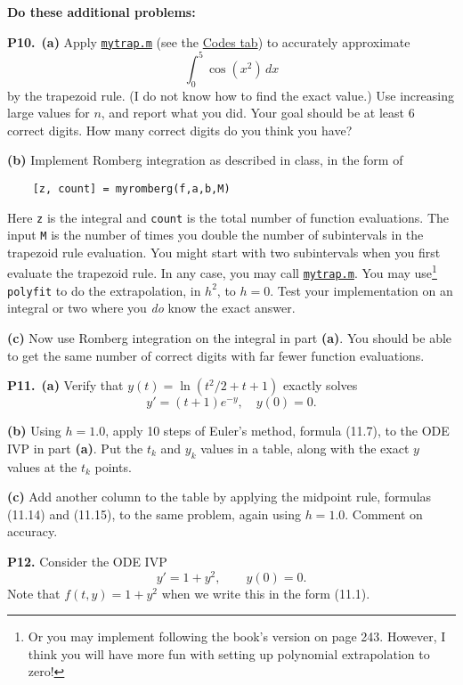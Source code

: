 \documentclass[12pt]{amsart}
\newcommand{\prob}[1]{\bigskip\noindent\textbf{#1.}\quad }
\newcommand{\epart}[1]{\medskip\noindent\textbf{(#1)}\quad }
\newcommand{\ppart}[1]{\,\textbf{(#1)}\quad }
\begin{document}
\medskip

\noindent \textbf{Do these additional problems:}

\prob{P10}  \ppart{a}  Apply \href{https://bueler.github.io/numerical/assets/codes/mytrap.m}{\texttt{mytrap.m}} (see the \href{https://bueler.github.io/numerical/codes.html}{Codes tab}) to accurately approximate
          $$\int_0^5 \cos(x^2)\,dx$$
by the trapezoid rule.  (I do not know how to find the exact value.)  Use increasing large values for $n$, and report what you did.  Your goal should be at least 6 correct digits.  How many correct digits do you think you have?

\epart{b}  Implement Romberg integration as described in class, in the form of 
      
       \verb|    [z, count] = myromberg(f,a,b,M)|

\noindent Here \verb|z| is the integral and \verb|count| is the total number of function evaluations.  The input \verb|M| is the number of times you double the number of subintervals in the trapezoid rule evaluation.  You might start with two subintervals when you first evaluate the trapezoid rule.  In any case, you may call \href{https://bueler.github.io/numerical/assets/codes/mytrap.m}{\texttt{mytrap.m}}.  You may use\footnote{\quad Or you may implement following the book's version on page 243.  However, I think you will have more fun with setting up polynomial extrapolation to zero!} \texttt{polyfit} to do the extrapolation, in $h^2$, to $h=0$.  Test your implementation on an integral or two where you \emph{do} know the exact answer.

\epart{c}  Now use Romberg integration on the integral in part \textbf{(a)}.  You should be able to get the same number of correct digits with far fewer function evaluations.


\prob{P11}  \ppart{a} Verify that $y(t) = \ln(t^2/2 + t + 1)$ exactly solves
	$$y'=(t+1)e^{-y}, \quad y(0)=0.$$

\epart{b}  Using $h=1.0$, apply 10 steps of Euler's method, formula (11.7), to the ODE IVP in part \textbf{(a)}.  Put the $t_k$ and $y_k$ values in a table, along with the exact $y$ values at the $t_k$ points.

\epart{c}  Add another column to the table by applying the midpoint rule, formulas (11.14) and (11.15), to the same problem, again using $h=1.0$.  Comment on accuracy.


\prob{P12} Consider the ODE IVP
        $$y'=1+y^2, \qquad y(0)=0.$$
Note that $f(t,y)=1+y^2$ when we write this in the form (11.1).
\end{document}
